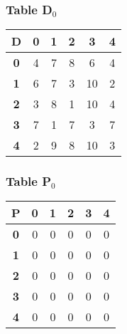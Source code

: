 


\begin{frame}
\frametitle{Table D$_{0}$}
\begin{center}
    \begin{tabular}{|c||c|c|c|c|c|}
        \hline
        \textbf{D} & \textbf{0} & \textbf{1} & \textbf{2} & \textbf{3} & \textbf{4} \\
        \hline
        \hline
        \textbf{0}& 4 & 7 & 8 & 6 & 4 \\
        \hline
        \textbf{1}& 6 & 7 & 3 & 10 & 2 \\
        \hline
        \textbf{2}& 3 & 8 & 1 & 10 & 4 \\
        \hline
        \textbf{3}& 7 & 1 & 7 & 3 & 7 \\
        \hline
        \textbf{4}& 2 & 9 & 8 & 10 & 3 \\
        \hline
    \end{tabular}
\end{center}


\end{frame}


\begin{frame}
\frametitle{Table P$_{0}$}
\begin{center}
    \begin{tabular}{|c||c|c|c|c|c|}
        \hline
        \textbf{P} & \textbf{0} & \textbf{1} & \textbf{2} & \textbf{3} & \textbf{4} \\
        \hline
        \hline
        \textbf{0}& 0 & 0 & 0 & 0 & 0 \\
        \hline
        \textbf{1}& 0 & 0 & 0 & 0 & 0 \\
        \hline
        \textbf{2}& 0 & 0 & 0 & 0 & 0 \\
        \hline
        \textbf{3}& 0 & 0 & 0 & 0 & 0 \\
        \hline
        \textbf{4}& 0 & 0 & 0 & 0 & 0 \\
        \hline
    \end{tabular}
\end{center}


\end{frame}


